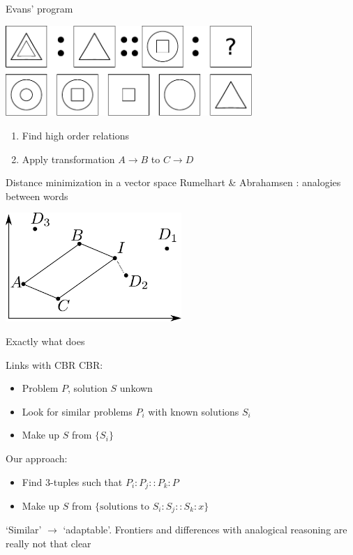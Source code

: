 \documentclass{beamer}
\begin{document}
\begin{frame}{Evans' program \cite{Eva64}}
  \begin{center}
  \includegraphics[width=0.7\textwidth]{figures/evans.pdf}
  \end{center}
  \begin{enumerate}
    \item Find high order relations
    \item Apply transformation $A \rightarrow B$ to $C \rightarrow D$
  \end{enumerate}
\end{frame}

\begin{frame}{Distance minimization in a vector space}
  Rumelhart \& Abrahamsen \cite{RumAbr73}: analogies between words
  \begin{center}
  \includegraphics[width=0.5\textwidth]{figures/rumelhart_model.pdf}
  \end{center}
  \alert{Exactly} what \cite{BayMicDelIJCAI07} does
\end{frame}

\begin{frame}{Links with CBR}
  CBR:
\begin{itemize}
  \item Problem $P$, solution $S$ unkown
  \item Look for similar problems $P_i$ with known solutions $S_i$
  \item Make up $S$ from $\{S_i\}$
\end{itemize}

Our approach:
\begin{itemize}
  \item Find $3$-tuples such that $P_i: P_j :: P_k : P$
  \item Make up $S$ from $\{ \text{solutions to } S_i: S_j :: S_k : x\}$
\end{itemize}
  `Similar' $\rightarrow$ `\alert{adaptable}'. Frontiers and differences with
  analogical reasoning are really not that clear
\end{frame}
\end{document}
